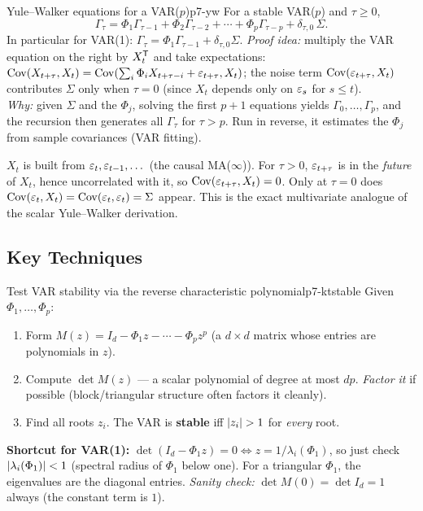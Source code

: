 \begin{theorem}{Yule--Walker equations for a VAR($p$)}{p7-yw}
For a stable VAR($p$) and $\tau\ge0$,
\[
\Gamma_\tau=\Phi_1\Gamma_{\tau-1}+\Phi_2\Gamma_{\tau-2}
+\cdots+\Phi_p\Gamma_{\tau-p}+\delta_{\tau,0}\,\Sigma .
\]
In particular for VAR(1): $\Gamma_\tau=\Phi_1\Gamma_{\tau-1}+\delta_{\tau,0}\Sigma$.
\textit{Proof idea:} multiply the VAR equation on the right by $X_t^{\mathsf{T}}$ and take
expectations: $\operatorname{Cov}(X_{t+\tau},X_t)=\operatorname{Cov}(\sum_i\Phi_i X_{t+\tau-i}+\varepsilon_{t+\tau},X_t)$;
the noise term $\operatorname{Cov}(\varepsilon_{t+\tau},X_t)$ contributes $\Sigma$ only when
$\tau=0$ (since $X_t$ depends only on $\varepsilon_s$ for $s\le t$).\\
\textit{Why:} given $\Sigma$ and the $\Phi_j$, solving the first $p+1$ equations
yields $\Gamma_0,\dots,\Gamma_p$, and the recursion then generates all
$\Gamma_\tau$ for $\tau>p$. Run in reverse, it estimates the $\Phi_j$ from sample
covariances (VAR fitting).
\end{theorem}

\begin{intuition}[Why the noise term only shows up at $\tau=0$]
$X_t$ is built from $\varepsilon_t,\varepsilon_{t-1},\dots$ (the causal MA($\infty$)). For
$\tau>0$, $\varepsilon_{t+\tau}$ is in the \emph{future} of $X_t$, hence uncorrelated
with it, so $\operatorname{Cov}(\varepsilon_{t+\tau},X_t)=0$. Only at $\tau=0$ does
$\operatorname{Cov}(\varepsilon_t,X_t)=\operatorname{Cov}(\varepsilon_t,\varepsilon_t)=\Sigma$ appear. This is the exact
multivariate analogue of the scalar Yule--Walker derivation.
\end{intuition}

\subsection{Key Techniques}

\begin{keytech}{Test VAR stability via the reverse characteristic polynomial}{p7-ktstable}
Given $\Phi_1,\dots,\Phi_p$:
\begin{enumerate}
  \item Form $M(z)=I_d-\Phi_1 z-\cdots-\Phi_p z^p$ (a $d\times d$ matrix whose
        entries are polynomials in $z$).
  \item Compute $\det M(z)$ --- a scalar polynomial of degree at most $dp$.
        \emph{Factor it} if possible (block/triangular structure often factors
        it cleanly).
  \item Find all roots $z_i$. The VAR is \textbf{stable} iff $\left\lvert z_i \right\rvert>1$ for
        \emph{every} root.
\end{enumerate}
\textbf{Shortcut for VAR(1):} $\det(I_d-\Phi_1 z)=0\iff z=1/\lambda_i(\Phi_1)$,
so just check $\left\lvert \lambda_i(\Phi_1) \right\rvert<1$ (spectral radius of $\Phi_1$ below
one). For a triangular $\Phi_1$, the eigenvalues are the diagonal entries.
\emph{Sanity check:} $\det M(0)=\det I_d=1$ always (the constant term is $1$).
\end{keytech}

